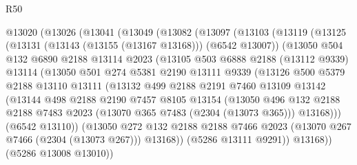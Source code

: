 \begin{lexlean}{R50}
\begin{coremodule}
    @13020
      (@13026
        (@13041
          (@13049
            (@13082
              (@13097
                (@13103
                  (@13119
                    (@13125
                      (@13131 (@13143 (@13155 (@13167 @13168))) (@6542 @13007))
                      (@13050
                        @504
                        @132
                        @6890
                        @2188
                        @13114
                        @2023
                        (@13105
                          @503
                          @6888
                          @2188
                          (@13112 @9339)
                          @13114
                          (@13050
                            @501
                            @274
                            @5381
                            @2190
                            @13111
                            @9339
                            (@13126
                              @500
                              @5379
                              @2188
                              @13110
                              @13111
                              (@13132
                                @499
                                @2188
                                @2191
                                @7460
                                @13109
                                @13142
                                (@13144
                                  @498
                                  @2188
                                  @2190
                                  @7457
                                  @8105
                                  @13154
                                  (@13050
                                    @496
                                    @132
                                    @2188
                                    @2188
                                    @7483
                                    @2023
                                    (@13070 @365 @7483 (@2304 (@13073 @365)))
                                    @13168)))
                              (@6542 @13110))
                            (@13050
                              @272
                              @132
                              @2188
                              @2188
                              @7466
                              @2023
                              (@13070 @267 @7466 (@2304 (@13073 @267)))
                              @13168))
                          (@5286 @13111 @9291))
                        @13168))
                    (@5286 @13008 @13010))

\end{coremodule}
\end{lexlean}
